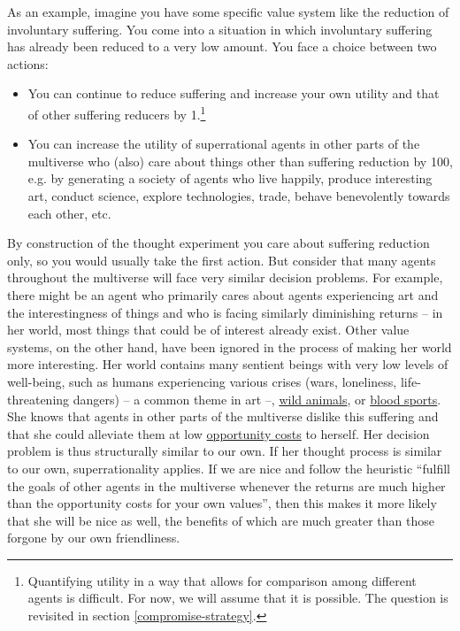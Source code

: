 As an example, imagine you have some specific value system like the
reduction of involuntary suffering. You come into a situation in which
involuntary suffering has already been reduced to a very low amount. You
face a choice between two actions:

\begin{itemize}
\item
  You can continue to reduce suffering and increase your own utility and
  that of other suffering reducers by 1.\footnote{Quantifying utility in
    a way that allows for comparison among different agents is
    difficult. For now, we will assume that it is possible. The question
    is revisited in section
    \ref{compromise-strategy}.}
\item
  You can increase the utility of superrational agents in other parts of
  the multiverse who (also) care about things other than suffering
  reduction by 100, e.g. by generating a society of agents who live
  happily, produce interesting art, conduct science, explore
  technologies, trade, behave benevolently towards each other, etc.
\end{itemize}

By construction of the thought experiment you care about suffering
reduction only, so you would usually take the first action. But consider
that many agents throughout the multiverse will face very similar
decision problems. For example, there might be an agent who primarily
cares about agents experiencing art and the interestingness of things
and who is facing similarly diminishing returns -- in her world, most
things that could be of interest already exist. Other value systems, on
the other hand, have been ignored in the process of making her world
more interesting. Her world contains many sentient beings with very low
levels of well-being, such as humans experiencing various crises (wars,
loneliness, life-threatening dangers) -- a common theme in art --,
\href{https://foundational-research.org/the-importance-of-wild-animal-suffering/}{wild
animals}, or
\href{https://en.wikipedia.org/wiki/Blood_sport}{blood sports}.
She knows that agents in other parts of the multiverse dislike this
suffering and that she could alleviate them at low
\href{https://en.wikipedia.org/wiki/Opportunity_cost}{opportunity
costs} to herself. Her decision problem is thus structurally similar to
our own. If her thought process is similar to our own, superrationality
applies. If we are nice and follow the heuristic ``fulfill the goals of
other agents in the multiverse whenever the returns are much higher than
the opportunity costs for your own values'', then this makes it more
likely that she will be nice as well, the benefits of which are much
greater than those forgone by our own friendliness.

